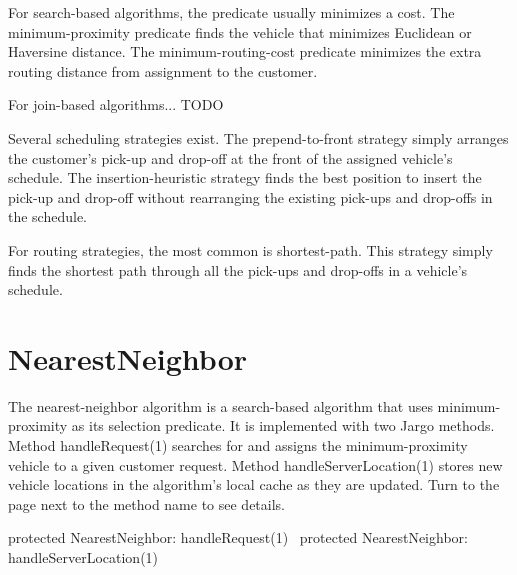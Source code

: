 For search-based algorithms, the predicate usually minimizes a cost. The
minimum-proximity predicate finds the vehicle that minimizes Euclidean or
Haversine distance. The minimum-routing-cost predicate minimizes the extra
routing distance from assignment to the customer.

For join-based algorithms... TODO

Several scheduling strategies exist. The prepend-to-front strategy simply
arranges the customer's pick-up and drop-off at the front of the assigned
vehicle's schedule. The insertion-heuristic strategy finds the best position to
insert the pick-up and drop-off without rearranging the existing pick-ups and
drop-offs in the schedule.

For routing strategies, the most common is shortest-path. This strategy
simply finds the shortest path through all the pick-ups and drop-offs in a
vehicle's schedule.

\section{NearestNeighbor}
\label{client-overview: nearest}

The nearest-neighbor algorithm is a search-based algorithm that uses
minimum-proximity as its selection predicate. It is implemented with two Jargo
methods. Method {\Tt{}handleRequest\nwendquote}(1) searches for and assigns the
minimum-proximity vehicle to a given customer request. Method
{\Tt{}handleServerLocation\nwendquote}(1) stores new vehicle locations in the algorithm's
local cache as they are updated. Turn to the page next to the method name
to see details.

\endmoddef\nwstartdeflinemarkup{}\nwenddeflinemarkup
protected \LA{}NearestNeighbor: handleRequest(1)~{\nwtagstyle{}}\RA{}
protected \LA{}NearestNeighbor: handleServerLocation(1)~{\nwtagstyle{}}\RA{}
\nwendcode{}

